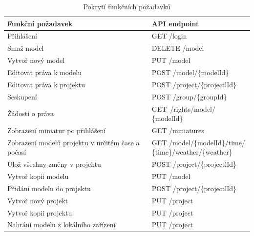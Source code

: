 \documentclass[thesis=B,czech]{FITthesis}[2012/06/26]
\begin{document}
        \begin{table}[h!]
        	\caption{Pokrytí funkčních požadavků} \label{tabulkaPokryti}
        	\begin{tabular}{| p{6cm} | p{5cm} |}\hline
        		Funkční požadavek & API endpoint
        		\tabularnewline \hline \hline
                Přihlášení & GET /login
            	\tabularnewline \hline
                Smaž model &	DELETE /model
            	\tabularnewline \hline
                Vytvoř nový model &	PUT /model
            	\tabularnewline \hline
                Editovat práva k modelu &	POST /model/\{modelId\}
            	\tabularnewline \hline
                Editovat práva k projektu &	POST /project/\{projectlId\}
            	\tabularnewline \hline
                Seskupení & POST /group/\{groupId\}
            	\tabularnewline \hline
                Žádosti o práva & GET~/rights/model/ \{modelId\}
            	\tabularnewline \hline
                Zobrazení miniatur po přihlášení & GET /miniatures
            	\tabularnewline \hline
                Zobrazení modelů projektu v určitém čase a počasí &
                \parbox[t]{5cm}{GET /model/\{modelId\}/time/\\\{time\}/weather/\{weather\}}
            	\tabularnewline \hline
                Ulož všechny změny v projektu &	POST /project/\{projectlId\}
            	\tabularnewline \hline
                Vytvoř kopii modelu	& PUT /model
            	\tabularnewline \hline
                Přidání modelu do projektu & POST /project/\{projectlId\}
            	\tabularnewline \hline
                Vytvoř nový projekt & PUT /project
            	\tabularnewline \hline
                Vytvoř kopii projektu &	PUT /project
            	\tabularnewline \hline
                Nahrání modelu z lokálního zařízení & PUT /project
            	\tabularnewline \hline
            \end{tabular}
        \end{table}
    \newpage
\end{document}
